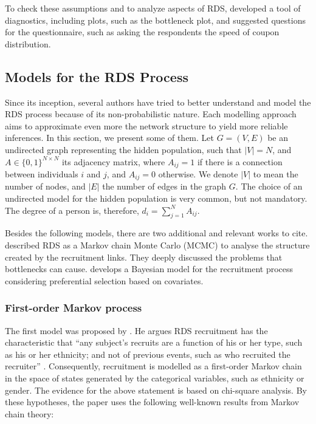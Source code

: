 To check these assumptions and to analyze aspects of RDS,
\textcite{gile2015diagnostics} developed a tool of diagnostics, including
plots, such as the bottleneck plot, and suggested questions for the
questionnaire, such as asking the respondents the speed of coupon distribution.

\subsection{Models for the RDS Process}
\label{sec:models-rds-process}

Since its inception, several authors have tried to better understand and model
the RDS process because of its non-probabilistic nature. Each modelling approach
aims to approximate even more the network structure to yield more reliable
inferences. In this section, we present some of them. Let $G = (V,E)$ be an
undirected graph representing the hidden population, such that $|V| = N$, and
$A \in \{0,1\}^{N \times N}$ its adjacency matrix, where $A_{ij} = 1$ if there
is a connection between individuals $i$ and $j$, and $A_{ij} = 0$ otherwise.
We denote $|V|$ to mean the number of nodes, and $|E|$ the number of edges in
the graph $G$. The choice of an undirected model for the hidden population is very common,
but not mandatory. The degree of a person is, therefore, $d_i = \sum_{j=1}^N
A_{ij}$.

Besides the following models, there are two additional and relevant works  to
cite. \textcite{goel2009respondent} described RDS as a Markov chain Monte
Carlo (MCMC) to analyse the structure created by the recruitment links. They deeply
discussed the problems that bottlenecks can cause.
\textcite{mclaughlin2021bayesian} develops a Bayesian model for the
recruitment process considering preferential selection based on covariates.


\subsubsection{First-order Markov process}
\label{sec:first-order-markov-process}

The first model was proposed by \textcite{heckathorn1997}. 
He argues RDS recruitment has the characteristic that ``any subject's recruits are
a function of his or her type, such as his or her ethnicity; and not of
previous events, such as who recruited the recruiter'' \cite[p. 182]{heckathorn1997}. Consequently, 
recruitment is modelled as a first-order Markov chain in the space of states
generated by the categorical variables, such as ethnicity or gender. The
evidence for the above statement is based on chi-square analysis. By these
hypotheses, the paper uses the following well-known results from Markov chain theory:

